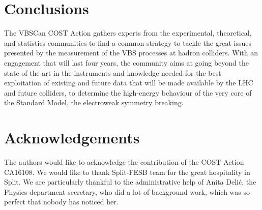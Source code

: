 \documentclass[12pt]{article}
\begin{document}


\section*{Conclusions}

The VBSCan COST Action
gathers experts from the experimental, theoretical, and statistics communities
to find a common strategy to tackle the great issues presented
by the measurement of the VBS processes at hadron colliders.
With an engagement that will last four years,
the community aims at going beyond the state of the art
in the instruments and knowledge needed for the best exploitation
of existing and future data 
that will be made available by the LHC and future colliders,
to determine the high-energy behaviour of the very core of the Standard Model,
the electroweak symmetry breaking.

\section*{Acknowledgements}

The authors would like to acknowledge the contribution of the COST Action CA16108.
We would like to thank Split-FESB team for the great hospitality in Split. 
We are particularly thankful to the administrative help of Anita Deli\'c, 
the Physics department secretary,
who did a lot of background work, 
which was so perfect that nobody has noticed her.

%
% 

\printbibliography
\end{document}
